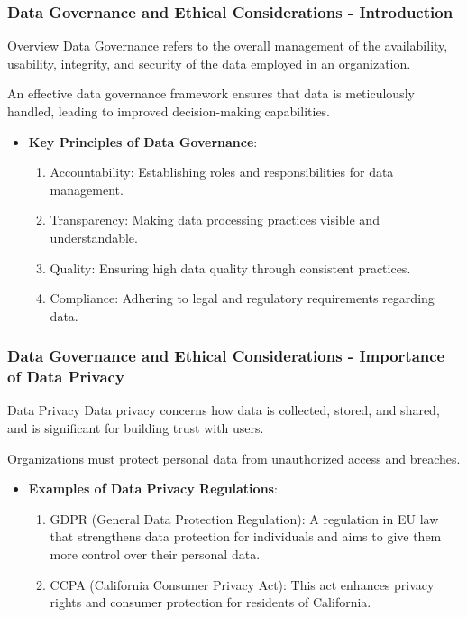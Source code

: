\documentclass[aspectratio=169]{beamer}
\begin{document}
\begin{frame}[fragile]
    \frametitle{Data Governance and Ethical Considerations - Introduction}
    \begin{block}{Overview}
        Data Governance refers to the overall management of the availability, usability, integrity, and security of the data employed in an organization.
    \end{block}
    An effective data governance framework ensures that data is meticulously handled, leading to improved decision-making capabilities.
    
    \begin{itemize}
        \item \textbf{Key Principles of Data Governance}:
        \begin{enumerate}
            \item Accountability: Establishing roles and responsibilities for data management.
            \item Transparency: Making data processing practices visible and understandable.
            \item Quality: Ensuring high data quality through consistent practices.
            \item Compliance: Adhering to legal and regulatory requirements regarding data.
        \end{enumerate}
    \end{itemize}
\end{frame}

\begin{frame}[fragile]
    \frametitle{Data Governance and Ethical Considerations - Importance of Data Privacy}
    \begin{block}{Data Privacy}
        Data privacy concerns how data is collected, stored, and shared, and is significant for building trust with users.
    \end{block}
    
    Organizations must protect personal data from unauthorized access and breaches.
    
    \begin{itemize}
        \item \textbf{Examples of Data Privacy Regulations}:
        \begin{enumerate}
            \item GDPR (General Data Protection Regulation): 
                A regulation in EU law that strengthens data protection for individuals and aims to give them more control over their personal data.
            \item CCPA (California Consumer Privacy Act): 
                This act enhances privacy rights and consumer protection for residents of California.
        \end{enumerate}
    \end{itemize}
\end{frame}
\end{document}
